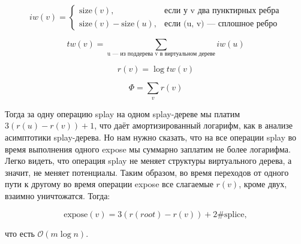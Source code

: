 $$iw(v) = \begin{cases}
		 \text{size}(v), & \text{если у v два пунктирных ребра}\\
		 \text{size}(v) - \text{size}(u), & \text{если (u, v) --- сплошное ребро}
		 \end{cases}$$

$$tw(v) = \sum_{\text{u --- из поддерева v в виртуальном дереве}} iw(u)$$

$$r(v) = \log{tw(v)}$$

$$\Phi = \sum_v r(v)$$

Тогда за одну операцию splay на одном splay-дереве мы платим $3(r(u) - r(v)) + 1$, что даёт амортизированный логарифм, как в анализе асимптотики splay-дерева. Но нам нужно сказать, что на все операции splay во время выполнения одного expose мы суммарно заплатим не более логарифма. Легко видеть, что операция splay не меняет структуры виртуального дерева, а значит, не меняет потенциалы. Таким образом, во время переходов от одного пути к другому во время операции expose все слагаемые $r(v)$, кроме двух, взаимно уничтожатся.
Тогда:

$$\text{expose}(v) = 3(r(root) - r(v)) + 2 \# \text{splice},$$

что есть $\mathcal{O}(m \log{n})$.